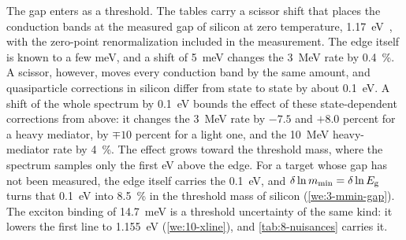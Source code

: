 The gap enters as a threshold. The tables carry a scissor shift that places the conduction bands at the measured gap of silicon at zero temperature, \SI{1.17}{eV}~\cite[Sect.~III\,B]{knapen2021dark}, with the zero-point renormalization included in the measurement. The edge itself is known to a few meV, and a shift of \SI{5}{meV} changes the \SI{3}{MeV} rate by \SI{0.4}{\percent}. A scissor, however, moves every conduction band by the same amount, and quasiparticle corrections in silicon differ from state to state by about \SI{0.1}{eV}. A shift of the whole spectrum by \SI{0.1}{eV} bounds the effect of these state-dependent corrections from above: it changes the \SI{3}{MeV} rate by $-7.5$ and $+8.0$ percent for a heavy mediator, by $\mp10$ percent for a light one, and the \SI{10}{MeV} heavy-mediator rate by \SI{4}{\percent}. The effect grows toward the threshold mass, where the spectrum samples only the first eV above the edge. For a target whose gap has not been measured, the edge itself carries the \SI{0.1}{eV}, and $\delta\ln m_{\mathrm{min}} = \delta\ln E_{\mathrm{g}}$ turns that \SI{0.1}{eV} into \SI{8.5}{\percent} in the threshold mass of silicon (\cref{we:3-mmin-gap}). The exciton binding of \SI{14.7}{meV} is a threshold uncertainty of the same kind: it lowers the first line to \SI{1.155}{eV} (\cref{we:10-xline}), and \cref{tab:8-nuisances} carries it.

